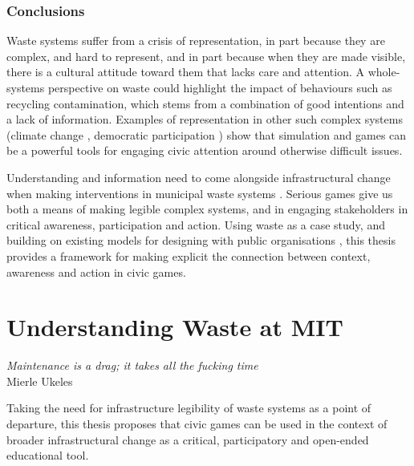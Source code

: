 \documentclass[nofonts,nols,justified,nobib]{tufte-book}
\begin{document}
\subsection*{Conclusions}
Waste systems suffer from a crisis of representation, in part because they are complex, and hard to represent, and in part because when they are made visible, there is a cultural attitude toward them that lacks care and attention. A whole-systems perspective on waste could highlight the impact of behaviours such as recycling contamination, which stems from a combination of good intentions and a lack of information. Examples of representation in other such complex systems (climate change \cite{sterman_world_2015, macklin_games_2013}, democratic participation \cite{lerner_making_2014, case_build_2016}) show that simulation and games can be a powerful tools for engaging civic attention around otherwise difficult issues.

Understanding and information need to come alongside infrastructural change when making interventions in municipal waste systems \cite{kline_rationalizing_1988}. Serious games give us both a means of making legible complex systems, and in engaging stakeholders in critical awareness, participation and action. Using waste as a case study, and building on existing models for designing with public organisations \cite{schaminee_designing_2018}, this thesis provides a framework for making explicit the connection between context, awareness and action in civic games.




\chapter{Understanding Waste at MIT}

\begin{flushright}
\emph{Maintenance is a drag; it takes all the fucking time} \cite{ukeles_manifesto_1969}\\
Mierle Ukeles
\end{flushright}

Taking the need for infrastructure legibility of waste systems as a point of departure, this thesis proposes that civic games can be used in the context of broader infrastructural change as a critical, participatory and open-ended educational tool.
\end{document}

